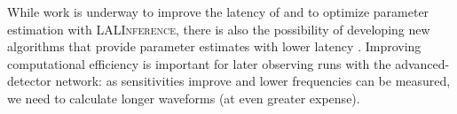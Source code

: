 While work is underway to improve the latency of and to optimize parameter estimation with \textsc{LALInference}, there is also the possibility of developing new algorithms that provide parameter estimates with lower latency \citep{Pankow:2015cra}. Improving computational efficiency is important for later observing runs with the advanced-detector network: as sensitivities improve and lower frequencies can be measured, we need to calculate longer waveforms (at even greater expense).
  
  
  
